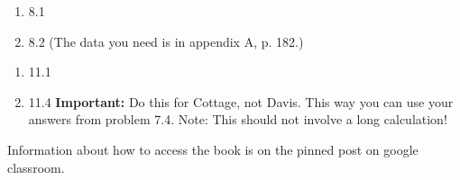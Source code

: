\documentclass[12pt]{article}
\begin{document}
\begin{enumerate}
\setlength{\itemsep}{-1mm}
  \item 8.1
  \item 8.2 (The data you need is in appendix A, p. 182.)\\ 
\end{enumerate}

\begin{enumerate}
\setlength{\itemsep}{-1mm}
\item 11.1
\item 11.4 {\bf Important:} Do this for Cottage, not Davis. This way
  you can use your answers from problem 7.4. Note: This should not
  involve a long calculation!\\ 
\end{enumerate}




\noindent Information about how to access the book is on the
pinned post on google classroom. 
\end{document}
